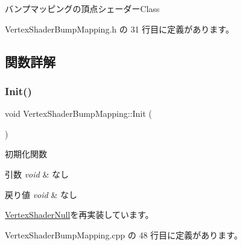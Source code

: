 バンプマッピングの頂点シェーダー\+Class 

 Vertex\+Shader\+Bump\+Mapping.\+h の 31 行目に定義があります。



\subsection{関数詳解}
\mbox{\label{class_vertex_shader_bump_mapping_a6c0f59d1f29fd883943a66bfe61b6b03}} 
\subsubsection{\texorpdfstring{Init()}{Init()}}
{\footnotesize\ttfamily void Vertex\+Shader\+Bump\+Mapping\+::\+Init (\begin{DoxyParamCaption}{ }\end{DoxyParamCaption})\hspace{0.3cm}{\ttfamily [virtual]}}



初期化関数 


\begin{DoxyParams}{引数}
{\em void} & なし \\
\hline
\end{DoxyParams}

\begin{DoxyRetVals}{戻り値}
{\em void} & なし \\
\hline
\end{DoxyRetVals}


\mbox{\hyperlink{class_vertex_shader_null_a4d79b358dab49c840345d74823a16840}{Vertex\+Shader\+Null}}を再実装しています。



 Vertex\+Shader\+Bump\+Mapping.\+cpp の 48 行目に定義があります。

\mbox{\label{class_vertex_shader_bump_mapping_aea3347e35f823d5272b4adcd2ca9724a}} 

